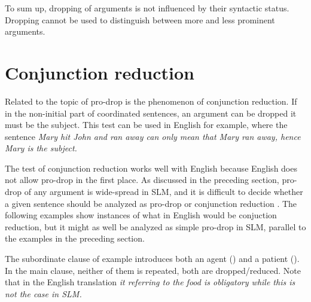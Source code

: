 
To sum up, dropping of arguments is not influenced by their syntactic status. Dropping cannot be used to distinguish between more and less prominent arguments.

\section{Conjunction reduction}\label{sec:grel:Conjunctionreduction}
Related to the topic of pro-drop is the phenomenon of conjunction reduction. If in the non-initial part of coordinated sentences, an argument can be dropped it must be the subject. This test can be used in English for example, where the sentence \em Mary hit John and \zero{} ran away \em can only mean that Mary ran away, hence \em Mary \em is the subject. 

The test of conjunction reduction works well with English because English does not allow pro-drop in the first place. As discussed in the preceding section, pro-drop of any argument is wide-spread in SLM, and it is difficult to decide whether a given sentence should be analyzed as pro-drop or conjunction reduction \citep[cf.][17]{Himmelmann2005typochar}.
The following examples show instances of what in English would be conjuction reduction, but it might as well be analyzed as simple pro-drop in SLM, parallel to the examples in the preceding section.

The subordinate clause of example  introduces both an agent () and a patient (). In the main clause, neither of them is repeated, both are dropped/reduced. Note that in the English translation \em it \em referring to the food is obligatory while this is not the case in SLM.



